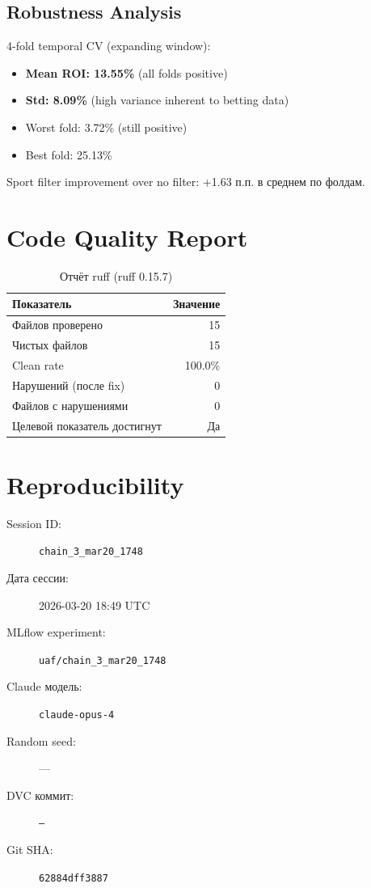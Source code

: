 \documentclass[12pt,a4paper]{article}
\begin{document}
\subsection{Robustness Analysis}

4-fold temporal CV (expanding window):
\begin{itemize}
  \item \textbf{Mean ROI: 13.55\%} (all folds positive)
  \item \textbf{Std: 8.09\%} (high variance inherent to betting data)
  \item Worst fold: 3.72\% (still positive)
  \item Best fold: 25.13\%
\end{itemize}

Sport filter improvement over no filter: +1.63 п.п. в среднем по фолдам.








\section{Code Quality Report}

\begin{table}[H]
\centering
\caption{Отчёт ruff (ruff 0.15.7)}
\begin{tabular}{lr}
\toprule
Показатель & Значение \\
\midrule
Файлов проверено & 15 \\
Чистых файлов & 15 \\
Clean rate & \textcolor{passcolor}{100.0\%} \\
Нарушений (после fix) & \textcolor{passcolor}{0} \\
Файлов с нарушениями & 0 \\
Целевой показатель достигнут & \textcolor{passcolor}{Да} \\
\bottomrule
\end{tabular}
\end{table}





\section{Reproducibility}

\begin{description}
    \item[Session ID:] \texttt{chain\_3\_mar20\_1748}
    \item[Дата сессии:] 2026-03-20 18:49 UTC
    \item[MLflow experiment:] \texttt{uaf/chain\_3\_mar20\_1748}
    \item[Claude модель:] \texttt{claude-opus-4}
    \item[Random seed:] ---
    \item[DVC коммит:] \texttt{---}
    \item[Git SHA:] \texttt{62884dff3887}
\end{description}
\end{document}
